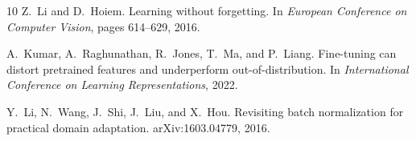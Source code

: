 \documentclass[10pt,twocolumn,letterpaper]{article}
\begin{document}
\begin{thebibliography}{10}
Z.~Li and D.~Hoiem.
\newblock Learning without forgetting.
\newblock In {\em European Conference on Computer Vision}, pages 614--629, 2016.

A.~Kumar, A.~Raghunathan, R.~Jones, T.~Ma, and P.~Liang.
\newblock Fine-tuning can distort pretrained features and underperform out-of-distribution.
\newblock In {\em International Conference on Learning Representations}, 2022.

Y.~Li, N.~Wang, J.~Shi, J.~Liu, and X.~Hou.
\newblock Revisiting batch normalization for practical domain adaptation.
\newblock arXiv:1603.04779, 2016.

\end{thebibliography}
\end{document}
